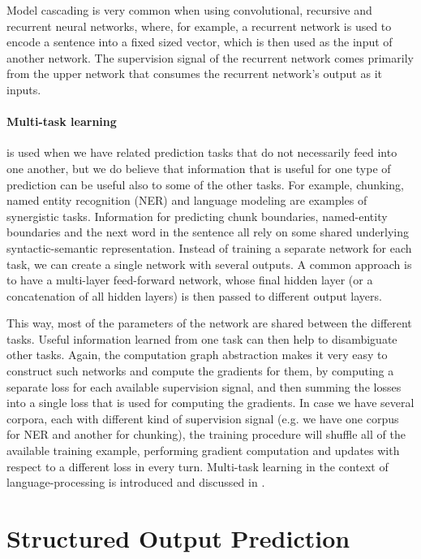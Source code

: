 \documentclass[jair,twoside,11pt,theapa]{article}
\newcommand{\ygcomment}[1]{\textbf{[TODO: #1]}}
\renewcommand{\ygcomment}[1]{}
\begin{document}
{Model cascading is very common when using convolutional, recursive and recurrent neural
networks, where, for example, a recurrent network is used to encode a sentence
into a fixed sized vector, which is then used as the input of another network.
The supervision signal of the recurrent network comes primarily from the upper
network that consumes the recurrent network's output as it inputs.

\paragraph{Multi-task learning} is used when we have related prediction tasks that do not
necessarily feed into one another, but we do believe that information that is
useful for one type of prediction can be useful also to some of the other tasks.
For example, chunking, named entity recognition (NER) and language modeling are
examples of synergistic tasks. Information for predicting chunk boundaries,
named-entity boundaries and the next word in the sentence all rely on some
shared underlying syntactic-semantic representation.  Instead of training a
separate network for each task, we can create a single network with several
outputs.  A common approach is to have a multi-layer feed-forward network, whose
final hidden layer (or a concatenation of all hidden layers) is then passed to
different output layers.
\ygcomment{figure!}
This way, most of the parameters of the network are
shared between the different tasks.  Useful information learned from one
task can then help to disambiguate other tasks.  
Again, the computation graph abstraction makes it very easy to construct such
networks and compute the gradients for them, by computing a separate loss for
each available supervision signal, and then summing the losses into a single
loss that is used for computing the gradients.  In case we have several corpora,
each with different kind of supervision signal (e.g. we have one corpus for NER
and another for chunking), the training procedure will shuffle all of the
available training example, performing gradient computation and updates with
respect to a different loss in every turn.  Multi-task learning in the context
of language-processing is introduced and discussed in \cite{collobert2011natural}.



\clearpage
\section{Structured Output Prediction}
\label{sec:structured}

}
\end{document}
